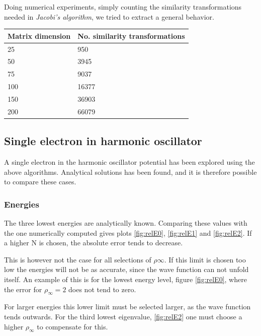 \documentclass[11pt,a4paper,english,final]{article}
\numberwithin{equation}{section}
\begin{document}
Doing numerical experiments, simply counting the similarity transformations needed in \emph{Jacobi's algorithm}, we tried to extract a general behavior.   

\begin{center}
\begin{tabular}{ |l|l| }
  \hline
  \textbf{Matrix dimension} & \textbf{No. similarity transformations} \\
  \hline
  25 & 950 \\
  \hline
  50 & 3945 \\
  \hline
  75  & 9037 \\
  \hline
  100 & 16377 \\
  \hline
  150 & 36903 \\
  \hline
  200 & 66079 \\
  \hline
\end{tabular}
\vspace{0.5cm}
\end{center}



\subsection{Single electron in harmonic oscillator}

A single electron in the harmonic oscillator potential has been 
explored using the above algorithms. Analytical solutions has been
found, and it is therefore possible to compare these cases.

\subsubsection{Energies}

The three lowest energies are analytically known. Comparing these values
with the one numerically computed gives plots \ref{fig:relE0}, 
\ref{fig:relE1} and \ref{fig:relE2}. If a higher N is chosen, the 
absolute error tends to decrease.

This is however not the case for all selections 
of $\rho\infty$. If this limit is chosen too low the energies will 
not be as accurate, since the wave function can not unfold itself.
An example of this is for the lowest energy level, figure \ref{fig:relE0},
where the error for $\rho_\infty = 2$ does not tend to zero.

For larger energies this lower limit must be selected larger, as the 
wave function tends outwards. For the third lowest eigenvalue, 
\ref{fig:relE2} one must choose a higher $\rho_\infty$ to compensate 
for this.
\end{document}
